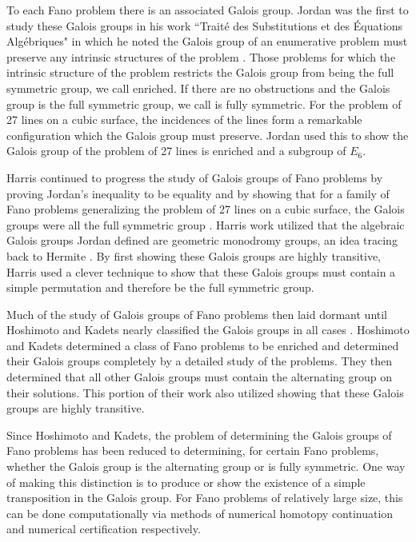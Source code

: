 \documentclass[12pt]{amsart}
\theoremstyle{definition}
\newcommand{\defcolor}[1]{{\color{RoyalBlue}#1}}
\begin{document}
%
To each Fano problem there is an associated Galois group. Jordan was the first to study these Galois groups in his work  ``Trait\'{e} des Substitutions et des \'{E}quations Alg\'{e}briques" in which he noted the Galois group of an enumerative problem must preserve any intrinsic structures of the problem \cite{Jordan}. Those problems for which the intrinsic structure of the problem restricts the Galois group from being the full symmetric group, we call \defcolor{enriched}. If there are no obstructions and the Galois group is the full symmetric group, we call is \defcolor{fully symmetric}. For the problem of 27 lines on a cubic surface, the incidences of the lines form a remarkable configuration which the Galois group must preserve. Jordan used this to show the Galois group of the problem of 27 lines is enriched and a subgroup of $E_6$. 

Harris continued to progress the study of Galois groups of Fano problems by proving Jordan's inequality to be equality and by showing that for a family of Fano problems generalizing the problem of 27 lines on a cubic surface, the Galois groups were all the full symmetric group \cite{Harris}. Harris work utilized that the algebraic Galois groups Jordan defined are geometric monodromy groups, an idea tracing back to Hermite \cite{Hermite}. By first showing these Galois groups are highly transitive, Harris used a clever technique to show that these Galois groups must contain a simple permutation and therefore be the full symmetric group. 

Much of the study of Galois groups of Fano problems then laid dormant until Hoshimoto and Kadets nearly classified the Galois groups in all cases \cite{HK}. Hoshimoto and Kadets determined a class of Fano problems to be enriched and determined their Galois groups completely by a detailed study of the problems. They then determined that all other Galois groups must contain the alternating group on their solutions. This portion of their work also utilized showing that these Galois groups are highly transitive.

%
Since Hoshimoto and Kadets, the problem of determining the Galois groups of Fano problems has been reduced to determining, for certain Fano problems, whether the Galois group is the alternating group or is fully symmetric. One way of making this distinction is to produce or show the existence of a simple transposition in the Galois group. For Fano problems of relatively large size, this can be done computationally via methods of numerical homotopy continuation and numerical certification respectively.
\end{document}
